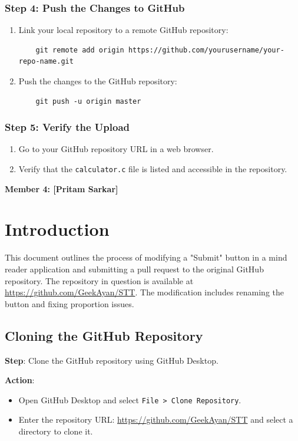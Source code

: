 \documentclass{article}
\begin{document}
\subsubsection{Step 4: Push the Changes to GitHub}
\begin{enumerate}
    \item Link your local repository to a remote GitHub repository:
    \begin{verbatim}
    git remote add origin https://github.com/yourusername/your-repo-name.git
    \end{verbatim}
    \item Push the changes to the GitHub repository:
    \begin{verbatim}
    git push -u origin master
    \end{verbatim}
\end{enumerate}

\subsubsection{Step 5: Verify the Upload}
\begin{enumerate}
    \item Go to your GitHub repository URL in a web browser.
    \item Verify that the \texttt{calculator.c} file is listed and accessible in the repository.
\end{enumerate}
\vspace{10in}
\begin{center}
    \textbf{\LARGE{{Member 4: [Pritam Sarkar]}}}
\end{center}
\section{Introduction}
This document outlines the process of modifying a "Submit" button in a mind reader application and submitting a pull request to the original GitHub repository. The repository in question is available at \url{https://github.com/GeekAyan/STT}. The modification includes renaming the button and fixing proportion issues.

\subsection{Cloning the GitHub Repository}
\textbf{Step}: Clone the GitHub repository using GitHub Desktop.

\textbf{Action}:
\begin{itemize}
    \item Open GitHub Desktop and select \texttt{File > Clone Repository}.
    \item Enter the repository URL: \url{https://github.com/GeekAyan/STT} and select a directory to clone it.
\end{itemize}
\end{document}
